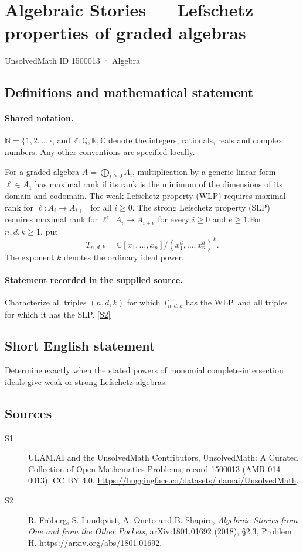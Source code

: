 \documentclass[11pt]{article}
\newcommand{\sref}[2]{\hyperlink{source:#1:#2}{[S#2]}}
\begin{document}
\setcounter{section}{1500012}
\section{Algebraic Stories — Lefschetz properties of graded algebras}\label{1500013}
{\small\sffamily UnsolvedMath ID 1500013 · Algebra}
\subsection{Definitions and mathematical statement}

\paragraph{Shared notation.}$\mathbb N=\{1,2,\ldots\}$, and $\mathbb Z,\mathbb Q,\mathbb R,\mathbb C$ denote the integers, rationals, reals and complex numbers. Any other conventions are specified locally.


For a graded algebra $A=\bigoplus_{i\geq0}A_i$, multiplication by a generic linear form $\ell\in A_1$ has maximal rank if its rank is the minimum of the dimensions of its domain and codomain. The weak Lefschetz property (WLP) requires maximal rank for $\ell:A_i\to A_{i+1}$ for all $i\geq0$. The strong Lefschetz property (SLP) requires maximal rank for $\ell^e:A_i\to A_{i+e}$ for every $i\geq0$ and $e\geq1$.For $n,d,k\geq1$, put
\[T_{n,d,k}=\mathbb C[x_1,\ldots,x_n]/(x_1^d,\ldots,x_n^d)^k.
\]
The exponent $k$ denotes the ordinary ideal power.
\paragraph{Statement recorded in the supplied source.}
Characterize all triples $(n,d,k)$ for which $T_{n,d,k}$ has the WLP, and all triples for which it has the SLP. \sref{1500013}{2}
\subsection{Short English statement}
Determine exactly when the stated powers of monomial complete-intersection ideals give weak or strong Lefschetz algebras.
\subsection{Sources}
\begin{description}
\item[\hypertarget{source:1500013:1}{S1}] ULAM.AI and the UnsolvedMath Contributors, UnsolvedMath: A Curated Collection of Open Mathematics Problems, record 1500013 (AMR-014-0013). CC BY 4.0. \url{https://huggingface.co/datasets/ulamai/UnsolvedMath}.
\item[\hypertarget{source:1500013:2}{S2}] R. Fröberg, S. Lundqvist, A. Oneto and B. Shapiro, \emph{Algebraic Stories from One and from the Other Pockets}, arXiv:1801.01692 (2018), §2.3, Problem H. \url{https://arxiv.org/abs/1801.01692}.
\end{description}
\label{end:1500013}
\end{document}
